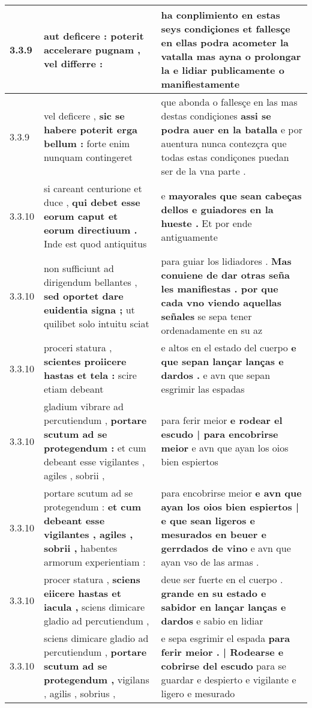 \begin{tabular}{|p{1cm}|p{6.5cm}|p{6.5cm}|}
3.3.9 & aut deficere : \textbf{ poterit accelerare pugnam , } vel differre : & ha conplimiento en estas seys condiçiones \textbf{ et fallesçe en ellas podra acometer la vatalla mas ayna o prolongar la } e lidiar publicamente o manifiestamente \\\hline
3.3.9 & vel deficere , \textbf{ sic se habere poterit erga bellum : } forte enim nunquam contingeret & que abonda o fallesçe en las mas destas condiçiones \textbf{ assi se podra auer en la batalla } e por auentura nunca contezçra que todas estas condiçones puedan ser de la vna parte . \\\hline
3.3.10 & si careant centurione et duce , \textbf{ qui debet esse eorum caput et eorum directiuum . } Inde est quod antiquitus & e \textbf{ mayorales que sean cabeças dellos e guiadores en la hueste . } Et por ende antiguamente \\\hline
3.3.10 & non sufficiunt ad dirigendum bellantes , \textbf{ sed oportet dare euidentia signa ; } ut quilibet solo intuitu sciat & para guiar los lidiadores . \textbf{ Mas conuiene de dar otras seña les manifiestas . por que cada vno viendo aquellas señales } se sepa tener ordenadamente en su az \\\hline
3.3.10 & proceri statura , \textbf{ scientes proiicere hastas et tela : } scire etiam debeant & e altos en el estado del cuerpo \textbf{ e que sepan lançar lanças e dardos . } e avn que sepan esgrimir las espadas \\\hline
3.3.10 & gladium vibrare ad percutiendum , \textbf{ portare scutum ad se protegendum : } et cum debeant esse vigilantes , agiles , sobrii , & para ferir meior \textbf{ e rodear el escudo | para encobrirse meior } e avn que ayan los oios bien espiertos \\\hline
3.3.10 & portare scutum ad se protegendum : \textbf{ et cum debeant esse vigilantes , agiles , sobrii , } habentes armorum experientiam : & para encobrirse meior \textbf{ e avn que ayan los oios bien espiertos | e que sean ligeros e mesurados en beuer e gerrdados de vino } e avn que ayan vso de las armas . \\\hline
3.3.10 & procer statura , \textbf{ sciens eiicere hastas et iacula , } sciens dimicare gladio ad percutiendum , & deue ser fuerte en el cuerpo . \textbf{ grande en su estado e sabidor en lançar lanças e dardos } e sabio en lidiar \\\hline
3.3.10 & sciens dimicare gladio ad percutiendum , \textbf{ portare scutum ad se protegendum , } vigilans , agilis , sobrius , & e sepa esgrimir el espada \textbf{ para ferir meior . | Rodearse e cobrirse del escudo } para se guardar e despierto e vigilante e ligero e mesurado \\\hline

\end{tabular}
